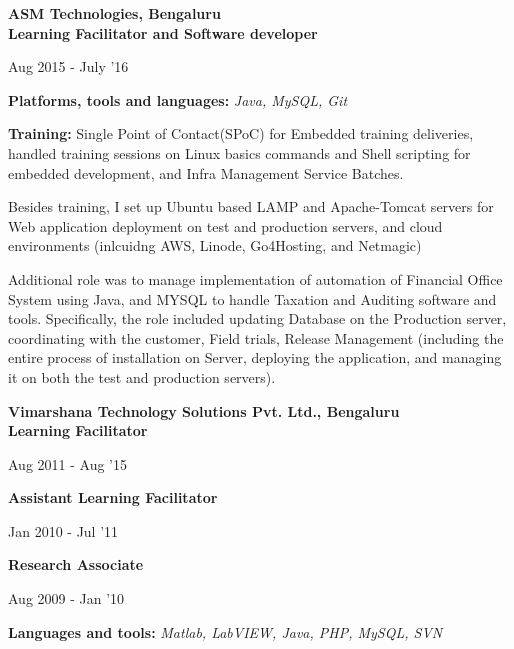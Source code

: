 \documentclass[10pt]{article}
\newenvironment{innerlist}[1][\enskip\textbullet]%
        {\begin{compactitem}[#1]}{\end{compactitem}}
\newenvironment{loneinnerlist}[1][\enskip\textbullet]%
        {\vspace{-\baselineskip}\begin{compactitem}[#1]}
        {\end{compactitem}\vspace{-.6\baselineskip}}
\begin{document}
\begin{loneinnerlist}
\begin{innerlist}
\end{innerlist}  \vspace*{2pt}

\textbf{ASM Technologies, Bengaluru} \\ \textbf{Learning Facilitator and Software developer} \\                      
\vspace*{-34pt} \begin{flushright} {Aug 2015 - July '16} \end{flushright}
\vspace*{-2pt} 
\textbf{Platforms, tools and languages:} \emph{Java, MySQL, Git}
\vspace*{2pt}
\begin{innerlist}
\item \textbf{Training:} Single Point of Contact(SPoC) for Embedded training deliveries, handled training sessions on Linux basics commands and Shell scripting for embedded development, and Infra Management Service Batches.
\item	Besides training, I set up Ubuntu based LAMP and Apache-Tomcat servers for Web application deployment on test and production servers, and cloud environments (inlcuidng AWS, Linode, Go4Hosting, and Netmagic)
\item	Additional role was to manage implementation of automation of Financial Office System using Java, and MYSQL to handle Taxation and Auditing software and tools.
\subitem	Specifically, the role included updating Database on the Production server, coordinating with the customer, Field trials, Release Management (including the entire process of installation on Server, deploying the application, and managing it on both the test and production servers).
\end{innerlist}  \vspace*{8pt}

\textbf{Vimarshana Technology Solutions Pvt. Ltd., Bengaluru} \\ \textbf{Learning Facilitator} \\ 
\vspace{-34pt} \begin{flushright} {Aug 2011 - Aug '15} \end{flushright}
\vspace*{-4pt}
\textbf{Assistant Learning Facilitator} \\
\vspace*{-34pt} \begin{flushright} {Jan 2010 - Jul '11} \end{flushright}
\vspace*{-4pt}
\textbf{Research Associate} \\
\vspace*{-36pt} \begin{flushright} {Aug 2009 - Jan '10} \end{flushright}
\vspace*{-2pt} 
\textbf{Languages and tools:} \emph{Matlab, LabVIEW, Java, PHP, MySQL, SVN}
\vspace*{4pt}


\end{loneinnerlist}
\end{document}
